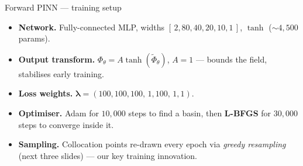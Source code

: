 \documentclass[aspectratio=169, 11pt]{beamer}
\begin{document}
\begin{frame}{Forward PINN --- training setup}
  \begin{itemize}
    \item \textbf{Network.} Fully-connected MLP, widths
          $[\,2,80,40,20,10,1\,]$, $\tanh$ ($\sim\!4{,}500$ params).
    \item \textbf{Output transform.}
          $\Phi_{\theta}=A\tanh(\widetilde{\Phi}_{\theta})$, $A=1$ ---
          bounds the field, stabilises early training.
    \item \textbf{Loss weights.}
          $\boldsymbol{\lambda} = (100,100,100,\,1,100,\,1,1)$.
    \item \textbf{Optimiser.} Adam for $10{,}000$ steps to find a basin, then
          \textbf{L-BFGS} for $30{,}000$ steps to converge inside it.
    \item \textbf{Sampling.} Collocation points re-drawn every epoch via
          \emph{greedy resampling} (next three slides) --- our key training
          innovation.
  \end{itemize}
\end{frame}
\end{document}
